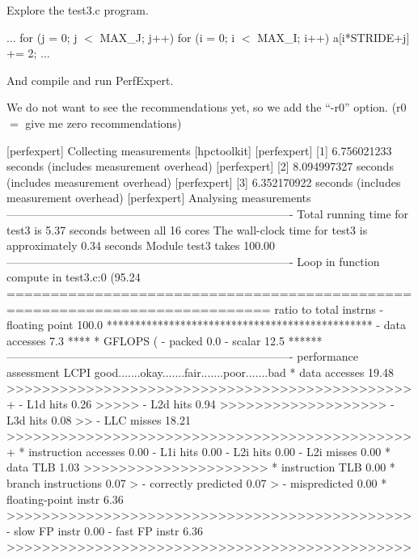 Explore the test3.c program.

\begin{prompt}
...
for (j = 0; j $<$ MAX_J; j++)
 for (i = 0; i $<$ MAX_I; i++)
   a[i*STRIDE+j] += 2;
...
\end{prompt}

And compile and run PerfExpert.

We do not want to see the recommendations yet, so we add the ``-r0'' option.  (r0 $=$ give me zero recommendations)

\begin{prompt}
[perfexpert] Collecting measurements [hpctoolkit]
[perfexpert]    [1] 6.756021233 seconds (includes measurement overhead)
[perfexpert]    [2] 8.094997327 seconds (includes measurement overhead)
[perfexpert]    [3] 6.352170922 seconds (includes measurement overhead)
[perfexpert] Analysing measurements
----------------------------------------------------------------------------
Total running time for test3 is 5.37 seconds between all 16 cores
The wall-clock time for test3 is approximately 0.34 seconds
Module test3 takes 100.00%
----------------------------------------------------------------------------
Loop in function compute in test3.c:0 (95.24%
============================================================================
ratio to total instrns    %
 - floating point      100.0 ***********************************************
 - data accesses         7.3 ****
* GFLOPS (%
 - packed                0.0
 - scalar               12.5 ******
----------------------------------------------------------------------------
performance assessment  LCPI good.......okay.......fair.......poor.......bad
* data accesses        19.48 >>>>>>>>>>>>>>>>>>>>>>>>>>>>>>>>>>>>>>>>>>>>>>+
 - L1d hits             0.26 >>>>>
 - L2d hits             0.94 >>>>>>>>>>>>>>>>>>>
 - L3d hits             0.08 >>
 - LLC misses          18.21 >>>>>>>>>>>>>>>>>>>>>>>>>>>>>>>>>>>>>>>>>>>>>>+
* instruction accesses  0.00
 - L1i hits             0.00
 - L2i hits             0.00
 - L2i misses           0.00
* data TLB              1.03 >>>>>>>>>>>>>>>>>>>>>
* instruction TLB       0.00
* branch instructions   0.07 >
 - correctly predicted  0.07 >
 - mispredicted         0.00
* floating-point instr  6.36 >>>>>>>>>>>>>>>>>>>>>>>>>>>>>>>>>>>>>>>>>>>>>>
 - slow FP instr        0.00
 - fast FP instr        6.36 >>>>>>>>>>>>>>>>>>>>>>>>>>>>>>>>>>>>>>>>>>>>>>
\end{prompt}

